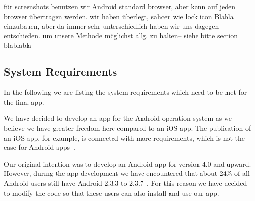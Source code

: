 \begin{description}[leftmargin=0cm]


	\item[Considered Browser] für screenshots benutzen wir Android standard browser, aber kann auf jeden browser übertragen werden.
 wir haben überlegt, sahcen wie lock icon Blabla einzubauen, aber da immer sehr unterschiedlich haben wir uns dagegen entschieden.
 um unsere Methode möglichst allg.
 zu halten-- siehe bitte section blablabla

\end{description}	

\subsection{System Requirements}
In the following we are listing the system requirements which need to be met for the final app.


\begin{description}[leftmargin=0cm]
	\item[Android] We have decided to develop an app for the Android operation system as we believe we have greater freedom here compared to an iOS app.
 The publication of an iOS app, for example, is connected with more requirements, which is not the case for Android apps~\cite{publishios, publishandroid}.
	\item[Version] Our original intention was to develop an Android app for version 4.0 and upward.
 However, during the app development we have encountered that about 24\% of all Android users still have Android 2.3.3 to 2.3.7~\cite{}. For this reason we have decided to modify the code so that these users can also install and use our app.
 
\end{description}

